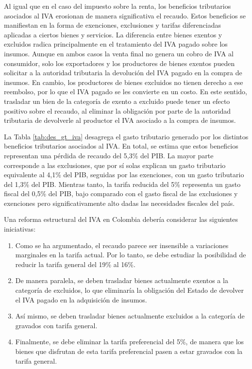 Al igual que en el caso del impuesto sobre la renta, los beneficios tributarios asociados al IVA erosionan de manera significativa el recaudo. Estos beneficios se manifiestan en la forma de exenciones, exclusiones y tarifas diferenciadas aplicadas a ciertos bienes y servicios. La diferencia entre bienes exentos y excluidos radica principalmente en el tratamiento del IVA pagado sobre los insumos. Aunque en ambos casos la venta final no genera un cobro de IVA al consumidor, solo los exportadores y los productores de bienes exentos pueden solicitar a la autoridad tributaria la devolución del IVA pagado en la compra de insumos. En cambio, los productores de bienes excluidos no tienen derecho a ese reembolso, por lo que el IVA pagado se les convierte en un costo. En este sentido, trasladar un bien de la categoría de exento a excluido puede tener un efecto positivo sobre el recaudo, al eliminar la obligación por parte de la autoridad tributaria de devolverle al productor el IVA asociado a la compra de insumos.




La Tabla \ref{tab:des_gt_iva} desagrega el gasto tributario generado por los distintos beneficios tributarios asociados al IVA. En total, se estima que estos beneficios representan una pérdida de recaudo del 5,3\% del PIB. La mayor parte corresponde a las exclusiones, que por sí solas explican un gasto tributario equivalente al 4,1\% del PIB, seguidas por las exenciones, con un gasto tributario del 1,3\% del PIB. Mientras tanto, la tarifa reducida del 5\% representa un gasto fiscal del 0,5\% del PIB, bajo comparado con el gasto fiscal de las exclusiones y exenciones pero significativamente alto dadas las necesidades fiscales del país. 

Una reforma estructural del IVA en Colombia debería considerar las siguientes iniciativas: 
\begin{enumerate}
    \item  Como se ha argumentado, el recaudo parece ser insensible a variaciones marginales en la tarifa actual. Por lo tanto, se debe estudiar la posibilidad de reducir la tarifa general del 19\% al 16\%.
    \item De manera paralela, se deben trasladar bienes actualmente exentos a la categoría de excluidos, lo que eliminaría la obligación del Estado de devolver el IVA pagado en la adquisición de insumos. 
    \item Así mismo, se deben trasladar bienes actualmente excluidos a la categoría de gravados con tarifa general. 
    \item Finalmente, se debe eliminar la tarifa preferencial del 5\%, de manera que los bienes que disfrutan de esta tarifa preferencial pasen a estar gravados con la tarifa general.
\end{enumerate}

